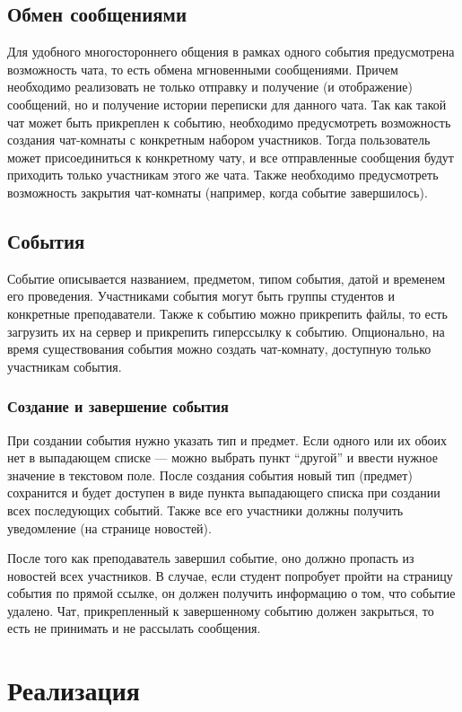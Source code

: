 \documentclass[14pt]{extarticle}
\begin{document}
\subsection{Обмен сообщениями}
Для удобного многостороннего общения в рамках одного события предусмотрена возможность чата, то есть обмена мгновенными сообщениями. Причем необходимо реализовать не только отправку и получение (и отображение) сообщений, но и получение истории переписки для данного чата. Так как такой чат может быть прикреплен к событию, необходимо предусмотреть возможность создания чат-комнаты с конкретным набором участников. Тогда пользователь может присоединиться к конкретному чату, и все отправленные сообщения будут приходить только участникам этого же чата. Также необходимо предусмотреть возможность закрытия чат-комнаты (например, когда событие завершилось).

\subsection{События}
Событие описывается названием, предметом, типом события, датой и временем его проведения. Участниками события могут быть группы студентов и конкретные преподаватели. Также к событию можно прикрепить файлы, то есть загрузить их на сервер и прикрепить гиперссылку к событию. Опционально, на время существования события можно создать чат-комнату, доступную только участникам события.

\subsubsection{Создание и завершение события}
При создании события нужно указать тип и предмет. Если одного или их обоих нет в выпадающем списке --- можно выбрать пункт \enquote{другой} и ввести нужное значение в текстовом поле. После создания события новый тип (предмет) сохранится и будет доступен в виде пункта выпадающего списка при создании всех последующих событий. Также все его участники должны получить уведомление (на странице новостей).

После того как преподаватель завершил событие, оно должно пропасть из новостей всех участников. В случае, если студент попробует пройти на страницу события по прямой ссылке, он должен получить информацию о том, что событие удалено. Чат, прикрепленный к завершенному событию должен закрыться, то есть не принимать и не рассылать сообщения.

\newpage
\section{Реализация}
\end{document}
